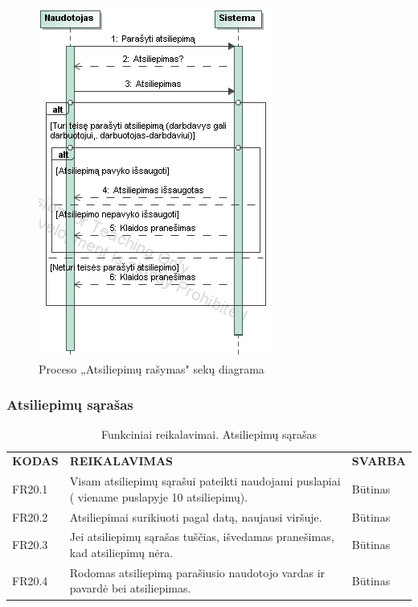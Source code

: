 \documentclass{VUMIFPSkursinis}
\begin{document}
\begin{figure}[H]
\centering
\includegraphics[scale=0.8, frame]{img/atsilras.png}
\caption{Proceso „Atsiliepimų rašymas" sekų diagrama}
\end{figure}

\subsubsection{Atsiliepimų sąrašas}
\begin{table}[H]
\caption{Funkciniai reikalavimai. Atsiliepimų sąrašas}
\centering
\normalsize
\begin{tabular}{|p{2cm}|p{10cm}|p{3cm}|}
\hline
\rowcolor{gray!30}
\multicolumn{3}{|l|}{\textbf{20. Atsiliepimų sąrašas}} \\ \hline
\textbf{KODAS}& \multicolumn{1}{m{10cm}|}{\textbf{REIKALAVIMAS}} & \textbf{SVARBA} \\ \hline
FR20.1 & \multicolumn{1}{m{10cm}|}{Visam atsiliepimų sąrašui pateikti naudojami puslapiai ( viename puslapyje 10 atsiliepimų).} & Būtinas \\ \hline
FR20.2 & \multicolumn{1}{m{10cm}|}{Atsiliepimai surikiuoti pagal datą, naujausi viršuje.} & Būtinas \\ \hline
FR20.3 & \multicolumn{1}{m{10cm}|}{Jei atsiliepimų sąrašas tuščias, išvedamas pranešimas, kad atsiliepimų nėra.} & Būtinas \\ \hline
FR20.4 & \multicolumn{1}{m{10cm}|}{Rodomas atsiliepimą parašiusio naudotojo vardas ir pavardė bei atsiliepimas.} & Būtinas \\ \hline
\end{tabular}
\end{table}
\end{document}
